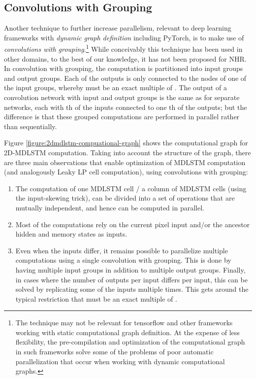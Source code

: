 \documentclass[conference]{IEEEtran}
\renewcommand{\ac}[1]{\gls{#1}}
\begin{document}
\subsection{Convolutions with Grouping}

Another technique to further increase parallelism, 
relevant to deep learning frameworks with \emph{dynamic graph definition} including PyTorch, 
is to make use of \emph{convolutions with grouping}.\footnote{The technique may not be relevant for tensorflow and other frameworks working with static computational graph definition. At the expense of less flexibility, the pre-compilation and optimization of the computational graph in such frameworks solve some of
the problems of poor automatic parallelization that occur when working with dynamic computational graphs.}
While conceivably this technique has been used in other domains, to the best of our knowledge, it has not been proposed for \ac{NHR}.
In convolution with grouping, the computation is partitioned into  input groups and  
output groups. Each of the  outputs is only connected to the nodes of one of the  input groups, whereby  must be an exact multiple of .
The output of a convolution network with  input and  output groups is the same as for  separate networks, each with th of the inputs connected to one th of the outputs; but the difference is that these  grouped computations are performed in parallel rather than sequentially.

Figure \ref{figure:2dmdlstm-compuational-graph} shows the computational graph for 2D-\ac{MDLSTM} computation. 
Taking into account the structure of the graph, there are three main observations that enable 
optimization of \ac{MDLSTM} computation (and analogously Leaky LP cell computation), using convolutions with grouping: 
\begin{enumerate}
\item The computation of one MDLSTM cell / a column of MDLSTM cells (using the input-skewing trick), can be divided into 
a set of operations that are mutually independent, and hence can be computed in parallel. 
\item Most of the computations rely on the current pixel input and/or the ancestor hidden and memory states as inputs. 
\item Even when the inputs differ, it remains possible to parallelize multiple computations using a single convolution with grouping.
This is done by having multiple input groups in addition to multiple output groups.
Finally, in cases where the number of outputs per input differs per input, 
this can be solved by replicating some of the inputs multiple times. This gets around the typical restriction that  must 
be an exact multiple of . 
\end{enumerate}
\end{document}
